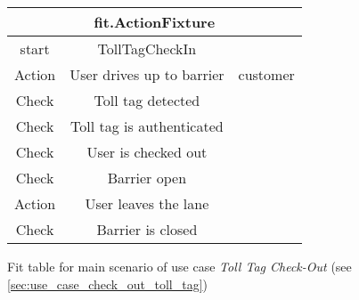 \begin{figure}[H]
\begin{centering}
\begin{tabular}{|c|c|c|}
\hline 
\multicolumn{3}{|c|}{fit.ActionFixture}\tabularnewline
\hline
start & TollTagCheckIn & \tabularnewline
\hline
Action & User drives up to barrier & customer \tabularnewline
\hline 
Check & Toll tag detected & \tabularnewline
\hline 
Check & Toll tag is authenticated & \tabularnewline
\hline 
Check & User is checked out & \tabularnewline
\hline 
Check & Barrier open\tabularnewline
\hline 
Action & User leaves the lane\tabularnewline
\hline 
Check & Barrier is closed\tabularnewline
\hline
\end{tabular}
\caption{Fit table for main scenario of use case \emph{Toll Tag Check-Out} (see \autoref{sec:use_case_check_out_toll_tag})}
\end{centering}
\end{figure}